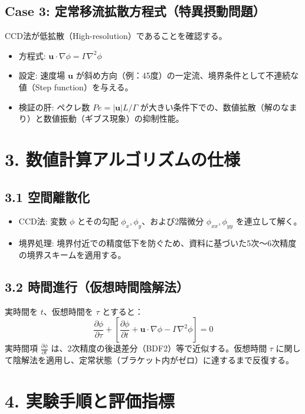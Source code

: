\documentclass[12pt, a4paper, titlepage]{article}
\begin{document}
\subsection*{Case 3: 定常移流拡散方程式（特異摂動問題）}
CCD法が低拡散（High-resolution）であることを確認する。
\begin{itemize}
    \item 方程式: $\mathbf{u} \cdot \nabla \phi = \Gamma \nabla^2 \phi$
    \item 設定: 速度場 $\mathbf{u}$ が斜め方向（例：45度）の一定流、境界条件として不連続な値（Step function）を与える。
    \item 検証の肝: ペクレ数 $Pe = |\mathbf{u}|L/\Gamma$ が大きい条件下での、数値拡散（解のなまり）と数値振動（ギブス現象）の抑制性能。
\end{itemize}

\section*{3. 数値計算アルゴリズムの仕様}

\subsection*{3.1 空間離散化}
\begin{itemize}
    \item CCD法: 変数 $\phi$ とその勾配 $\phi_x, \phi_y$、および2階微分 $\phi_{xx}, \phi_{yy}$ を連立して解く。
    \item 境界処理: 境界付近での精度低下を防ぐため、資料に基づいた5次〜6次精度の境界スキームを適用する。
\end{itemize}

\subsection*{3.2 時間進行（仮想時間陰解法）}
実時間を $t$、仮想時間を $\tau$ とすると：
$$\frac{\partial \phi}{\partial \tau} + \left[ \frac{\partial \phi}{\partial t} + \mathbf{u} \cdot \nabla \phi - \Gamma \nabla^2 \phi \right] = 0$$
実時間項 $\frac{\partial \phi}{\partial t}$ は、2次精度の後退差分（BDF2）等で近似する。仮想時間 $\tau$ に関して陰解法を適用し、定常状態（ブラケット内がゼロ）に達するまで反復する。

\section*{4. 実験手順と評価指標}
\end{document}
